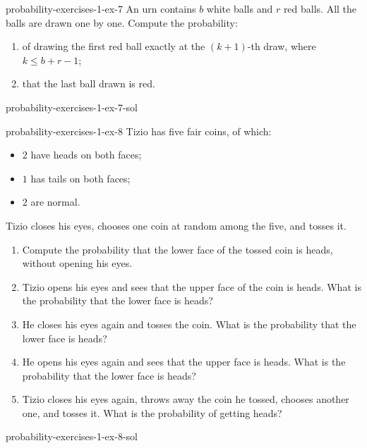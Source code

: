 \documentclass[preview]{standalone}
\begin{document}
\begin{snippetexercise}{probability-exercises-1-ex-7}{}
    An urn contains \(b\) white balls and \(r\) red balls. All the balls are drawn
    one by one. Compute the probability:
    \begin{enumerate}
        \item of drawing the first red ball exactly at the \((k+1)\)-th draw,
        where \(k \leq b+r-1\);
        \item that the last ball drawn is red.
    \end{enumerate}
\end{snippetexercise}

\begin{snippetsolution}{probability-exercises-1-ex-7-sol}{}
    \todo
\end{snippetsolution}

\begin{snippetexercise}{probability-exercises-1-ex-8}{}
    Tizio has five fair coins, of which:
    \begin{itemize}
        \item \(2\) have heads on both faces;
        \item \(1\) has tails on both faces;
        \item \(2\) are normal.
    \end{itemize}
    Tizio closes his eyes, chooses one coin at random among the five, and tosses it.
    \begin{enumerate}
        \item Compute the probability that the lower face of the tossed coin is
        heads, without opening his eyes.
        \item Tizio opens his eyes and sees that the upper face of the coin is heads.
        What is the probability that the lower face is heads?
        \item He closes his eyes again and tosses the coin. What is the probability
        that the lower face is heads?
        \item He opens his eyes again and sees that the upper face is heads. What is
        the probability that the lower face is heads?
        \item Tizio closes his eyes again, throws away the coin he tossed, chooses
        another one, and tosses it. What is the probability of getting heads?
    \end{enumerate}
\end{snippetexercise}

\begin{snippetsolution}{probability-exercises-1-ex-8-sol}{}
    \todo
\end{snippetsolution}
\end{document}
